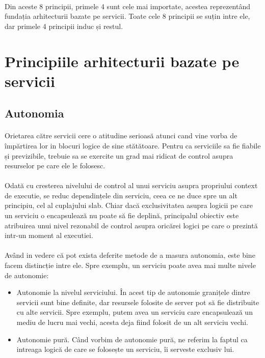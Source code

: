 \documentclass[12pt]{report}
\begin{document}
	\paragraph{}Din aceste 8 principii, primele 4 sunt cele mai importate, acestea reprezentând fundația arhitecturii bazate pe servicii. Toate cele 8 principii se suțin intre ele, dar primele 4 principii induc și restul.
  	\section{Principiile arhitecturii bazate pe servicii}
  	\subsection{Autonomia}
  	\paragraph{}Orietarea către servicii cere o atitudine serioasă atunci cand vine vorba de împărtirea lor in blocuri logice de sine stătătoare. Pentru ca serviciile sa fie fiabile și previzibile, trebuie sa se exercite un grad mai ridicat de control asupra resurselor pe care ele le folosesc.
  	\paragraph{}Odată cu cresterea nivelului de control al unui serviciu asupra propriului context de executie, se reduc dependințele din serviciu, ceea ce ne duce spre un alt principiu, cel al cuplajului slab. Chiar dacă exclusivitatea asupra logicii pe care un serviciu o encapsulează nu poate să fie deplină, principalul obiectiv este atribuirea unui nivel rezonabil de control asupra oricărei logici pe care o prezintă intr-un moment al executiei.\cite{erl4}
  	\paragraph{}Având in vedere că pot exista deferite metode de a masura autonomia, este bine facem distincție intre ele. Spre exemplu, un serviciu poate avea mai multe nivele de autonomie:
    \begin{itemize}
    \item Autonomie la nivelul serviciului. În acest tip de autonomie granițele dintre servicii sunt bine definite, dar resursele folosite de server pot să fie distribuite cu alte servicii. Spre exemplu, putem avea un serviciu care encapsulează un mediu de lucru mai vechi, acesta deja fiind folosit de un alt serviciu vechi.
    \item Autonomie pură. Când vorbim de autonomie pură, ne referim la faptul ca intreaga logică de care se folosește un serviciu, îi serveste exclusiv lui. 
    \end{itemize}
\end{document}

